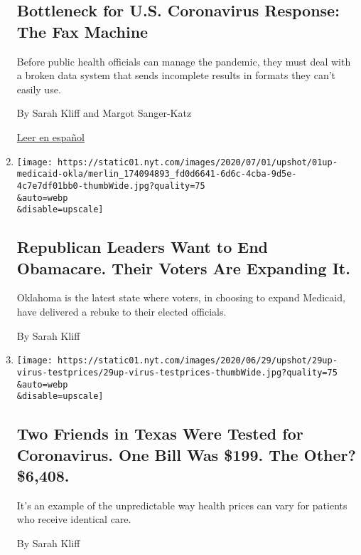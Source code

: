 \begin{enumerate}
  \hypertarget{bottleneck-for-us-coronavirus-response-the-fax-machine}{%
  \subsection{Bottleneck for U.S. Coronavirus Response: The Fax
  Machine}\label{bottleneck-for-us-coronavirus-response-the-fax-machine}}

  Before public health officials can manage the pandemic, they must deal
  with a broken data system that sends incomplete results in formats
  they can't easily use.

  By Sarah Kliff and Margot Sanger-Katz

  \href{https://www.nytimes.com/es/2020/07/15/espanol/mundo/coronavirus-sistema-salud-publica.html}{Leer
  en español}
\item
  \href{/2020/07/01/upshot/oklahoma-obamacare-Republican-voters-expand.html}{}

  \texttt{[image: https://static01.nyt.com/images/2020/07/01/upshot/01up-medicaid-okla/merlin\_174094893\_fd0d6641-6d6c-4cba-9d5e-4c7e7df01bb0-thumbWide.jpg?quality=75\\\&auto=webp\\\&disable=upscale]}

  \hypertarget{republican-leaders-want-to-end-obamacare-their-voters-are-expanding-it}{%
  \subsection{Republican Leaders Want to End Obamacare. Their Voters Are
  Expanding
  It.}\label{republican-leaders-want-to-end-obamacare-their-voters-are-expanding-it}}

  Oklahoma is the latest state where voters, in choosing to expand
  Medicaid, have delivered a rebuke to their elected officials.

  By Sarah Kliff
\item
  \href{/2020/06/29/upshot/coronavirus-tests-unpredictable-prices.html}{}

  \texttt{[image: https://static01.nyt.com/images/2020/06/29/upshot/29up-virus-testprices/29up-virus-testprices-thumbWide.jpg?quality=75\\\&auto=webp\\\&disable=upscale]}

  \hypertarget{two-friends-in-texas-were-tested-for-coronavirus-one-bill-was-199-the-other-6408}{%
  \subsection{Two Friends in Texas Were Tested for Coronavirus. One Bill
  Was \$199. The Other?
  \$6,408.}\label{two-friends-in-texas-were-tested-for-coronavirus-one-bill-was-199-the-other-6408}}

  It's an example of the unpredictable way health prices can vary for
  patients who receive identical care.

  By Sarah Kliff
\end{enumerate}


